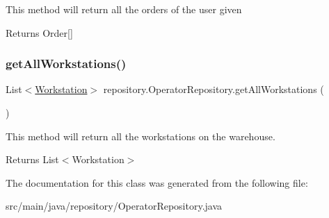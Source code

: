 This method will return all the orders of the user given

\begin{DoxyReturn}{Returns}
Order\mbox{[}\mbox{]} 
\end{DoxyReturn}
\mbox{\label{classrepository_1_1_operator_repository_a850e14590815e5590a93ab13020c198a}} 
\subsubsection{\texorpdfstring{get\+All\+Workstations()}{getAllWorkstations()}}
{\footnotesize\ttfamily List$<$\mbox{\hyperlink{classentity_1_1_workstation}{Workstation}}$>$ repository.\+Operator\+Repository.\+get\+All\+Workstations (\begin{DoxyParamCaption}{ }\end{DoxyParamCaption})\hspace{0.3cm}{\ttfamily [inline]}}

This method will return all the workstations on the warehouse. \begin{DoxyReturn}{Returns}
List$<$\+Workstation$>$ 
\end{DoxyReturn}


The documentation for this class was generated from the following file\+:\begin{DoxyCompactItemize}
\item 
src/main/java/repository/Operator\+Repository.\+java\end{DoxyCompactItemize}
